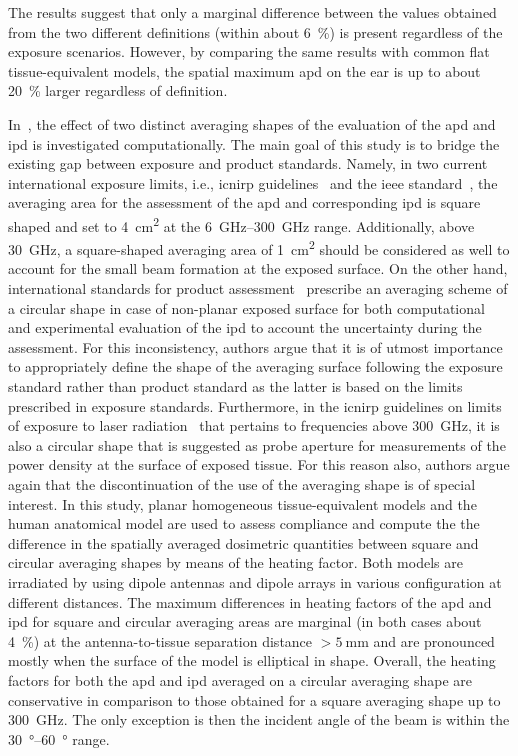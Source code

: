 The results suggest that only a marginal difference between the values obtained from the two different definitions (within about \SI{6}{\percent}) is present regardless of the exposure scenarios.
However, by comparing the same results with common flat tissue-equivalent models, the spatial maximum \gls{apd} on the ear is up to about \SI{20}{\percent} larger regardless of definition.

In~\cite{Morimoto2022Assessment}, the effect of two distinct averaging shapes of the evaluation of the \gls{apd} and \gls{ipd} is investigated computationally.
The main goal of this study is to bridge the existing gap between exposure and product standards.
Namely, in two current international exposure limits, i.e., \gls{icnirp} guidelines~\cite{ICNIRP2020Guidelines} and the \gls{ieee} standard~\cite{IEEE2019Standard}, the averaging area for the assessment of the \gls{apd} and corresponding \gls{ipd} is square shaped and set to \SI{4}{\cm\squared} at the \SIrange[range-units=single,range-phrase=--]{6}{300}{\GHz} range.
Additionally, above \SI{30}{\GHz}, a square-shaped averaging area of \SI{1}{\cm\squared} should be considered as well to account for the small beam formation at the exposed surface.
On the other hand, international standards for product assessment~\cite{IEC2018,IEC2022part1,IEC2022part2} prescribe an averaging scheme of a circular shape in case of non-planar exposed surface for both computational and experimental evaluation of the \gls{ipd} to account the uncertainty during the assessment.
For this inconsistency, authors argue that it is of utmost importance to appropriately define the shape of the averaging surface following the exposure standard rather than product standard as the latter is based on the limits prescribed in exposure standards.
Furthermore, in the \gls{icnirp} guidelines on limits of exposure to laser radiation~\cite{ICNIRP2013Guidelines} that pertains to frequencies above \SI{300}{\GHz}, it is also a circular shape that is suggested as probe aperture for measurements of the power density at the surface of exposed tissue.
For this reason also, authors argue again that the discontinuation of the use of the averaging shape is of special interest.
In this study, planar homogeneous tissue-equivalent models and the human anatomical model are used to assess compliance and compute the the difference in the spatially averaged dosimetric quantities between square and circular averaging shapes by means of the heating factor.
Both models are irradiated by using dipole antennas and dipole arrays in various configuration at different distances.
The maximum differences in heating factors of the \gls{apd} and \gls{ipd} for square and circular averaging areas are marginal (in both cases about \SI{4}{\percent}) at the antenna-to-tissue separation distance $> \SI{5}{\mm}$ and are pronounced mostly when the surface of the model is elliptical in shape.
Overall, the heating factors for both the \gls{apd} and \gls{ipd} averaged on a circular averaging shape are conservative in comparison to those obtained for a square averaging shape up to \SI{300}{\GHz}.
The only exception is then the incident angle of the beam is within the \SIrange[range-units=single,range-phrase=--]{30}{60}{\degree} range.

